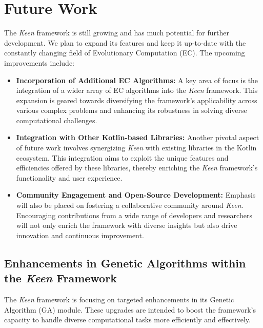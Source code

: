 \section{Future Work}
\label{sec:future_work}
    The \textit{Keen} framework is still growing and has much potential for further development. We plan to expand its 
    features and keep it up-to-date with the constantly changing field of Evolutionary Computation (EC). The upcoming 
    improvements include:

    \begin{itemize}
        \item \textbf{Incorporation of Additional EC Algorithms:} A key area of focus is the integration of a wider 
            array of EC algorithms into the \textit{Keen} framework. This expansion is geared towards diversifying the 
            framework's applicability across various complex problems and enhancing its robustness in solving diverse 
            computational challenges.
        \item \textbf{Integration with Other Kotlin-based Libraries:} Another pivotal aspect of future work involves 
            synergizing \textit{Keen} with existing libraries in the Kotlin ecosystem. This integration aims to exploit 
            the unique features and efficiencies offered by these libraries, thereby enriching the \textit{Keen} 
            framework's functionality and user experience.
        \item \textbf{Community Engagement and Open-Source Development:} Emphasis will also be placed on fostering a 
            collaborative community around \textit{Keen}. Encouraging contributions from a wide range of developers and 
            researchers will not only enrich the framework with diverse insights but also drive innovation and 
            continuous improvement.
    \end{itemize}

    \subsection{Enhancements in Genetic Algorithms within the \textit{Keen} Framework}
    \label{sec:future:ga}
        The \textit{Keen} framework is focusing on targeted enhancements in its Genetic Algorithm (GA) module. These 
        upgrades are intended to boost the framework's capacity to handle diverse computational tasks more efficiently 
        and effectively.

